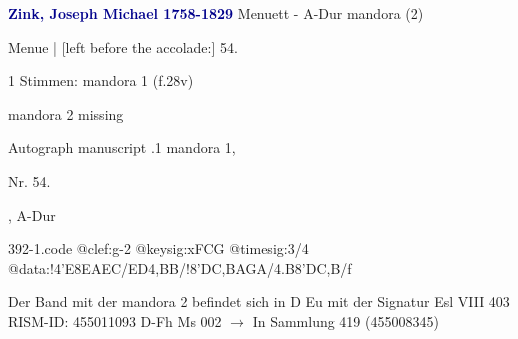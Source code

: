 \documentclass[twocolumn]{book}
\begin{document}
\newline \par \vspace{7pt} \textcolor{darkblue}{\textbf{Zink, Joseph Michael  1758-1829}}
\newline Menuett - A-Dur
\newline mandora (2)
\newline \begin{itshape}[f.28v, at left:] Menue | [left before the accolade:] 54.\end{itshape} 
\newline \textcolor{darkblue}{}  1 Stimmen: mandora 1  (f.28v)
\newline \begin{small} mandora 2 missing\end{small} 
\newline Autograph manuscript
.1  mandora 1, \begin{itshape}Nr. 54.\end{itshape}, A-Dur  
\begin{filecontents*}{392-1.code}
@clef:g-2
@keysig:xFCG
@timesig:3/4
@data:!4'E{8EAEC}/{ED}4,BB/!{8'DC}{,BA}{GA}/4.B8'D{C,B}/f
\end{filecontents*}
\newline
%
\newline Der Band mit der mandora 2 befindet sich in D Eu mit der Signatur Esl VIII 403
\newline RISM-ID: 455011093
\newline D-Fh  Ms 002
\newline $\rightarrow$ In Sammlung 419 (455008345)
      
\end{document}
